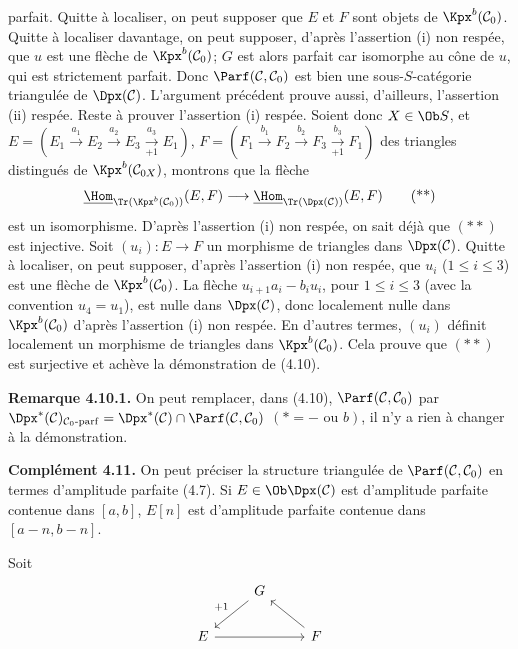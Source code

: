 parfait. Quitte à localiser, on peut supposer que \(E\) et \(F\) sont objets de \(\Kpx^b(\mathcal C_0)\). Quitte à localiser davantage, on peut supposer, d'après l'assertion (i) non respée, que \(u\) est une flèche de \(\Kpx^b(\mathcal C_0)\); \(G\) est alors parfait car isomorphe au cône de \(u\), qui est strictement parfait. Donc \(\Parf(\mathcal C,\mathcal C_0)\) est bien une sous-\(S\)-catégorie triangulée de \(\Dpx(\mathcal C)\). L'argument précédent prouve aussi, d'ailleurs, l'assertion (ii) respée. Reste à prouver l'assertion (i) respée. Soient donc \(X\in\Ob S\), et \(E=(E_1\xrightarrow{a_1}E_2\xrightarrow{a_2}E_3\xrightarrow[+1]{a_3}E_1)\), \(F=(F_1\xrightarrow{b_1}F_2\xrightarrow{b_2}F_3\xrightarrow[+1]{b_3}F_1)\) des triangles distingués de \(\Kpx^b(\mathcal C_{0X})\), montrons que la flèche
\[
  \underline{\Hom}_{\Tr(\Kpx^b(\mathcal C_0))}(E,F)
  \longrightarrow
  \underline{\Hom}_{\Tr(\Dpx(\mathcal C))}(E,F)
  \tag{**}
\]
est un isomorphisme. D'après l'assertion (i) non respée, on sait déjà que \((**)\) est injective. Soit \((u_i):E\to F\) un morphisme de triangles dans \(\Dpx(\mathcal C)\). Quitte à localiser, on peut supposer, d'après l'assertion (i) non respée, que \(u_i\) (\(1\leq i\leq3\)) est une flèche de \(\Kpx^b(\mathcal C_0)\). La flèche \(u_{i+1}a_i-b_iu_i\), pour \(1\leq i\leq3\) (avec la convention \(u_4=u_1\)), est nulle dans \(\Dpx(\mathcal C)\), donc localement nulle dans \(\Kpx^b(\mathcal C_0)\) d'après l'assertion (i) non respée. En d'autres termes, \((u_i)\) définit localement un morphisme de triangles dans \(\Kpx^b(\mathcal C_0)\). Cela prouve que \((**)\) est surjective et achève la démonstration de (4.10).

\textbf{Remarque 4.10.1.} On peut remplacer, dans (4.10), \(\Parf(\mathcal C,\mathcal C_0)\) par \(\Dpx^*(\mathcal C)_{\mathcal C_0\text{-}\mathrm{parf}}=\Dpx^*(\mathcal C)\cap\Parf(\mathcal C,\mathcal C_0)\) \((*=-\text{ ou }b)\), il n'y a rien à changer à la démonstration.

\textbf{Complément 4.11.} On peut préciser la structure triangulée de \(\Parf(\mathcal C,\mathcal C_0)\) en termes d'amplitude parfaite (4.7). Si \(E\in\Ob\Dpx(\mathcal C)\) est d'amplitude parfaite contenue dans \([a,b]\), \(E[n]\) est d'amplitude parfaite contenue dans \([a-n,b-n]\).

Soit
\[
\begin{tikzcd}
& G \arrow[dl,"+1"'] & \\
E \arrow[rr] && F \arrow[ul]
\end{tikzcd}
\]
